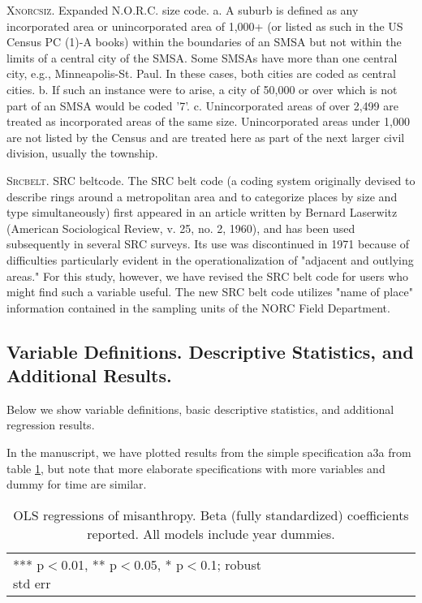 \documentclass[11pt, letterpaper]{article}
\begin{document}
\begin{spacing}{1.4}
\textsc{Xnorcsiz}. Expanded N.O.R.C. size code. 
a. A suburb is defined as any incorporated area or unincorporated area
of 1,000+ (or listed as such in the US Census PC (1)-A books) within
the boundaries of an SMSA but not within the limits of a central city
of the SMSA. Some SMSAs have more than one central city, e.g.,
Minneapolis-St. Paul. In these cases, both cities are coded as central
cities.
b. If such an instance were to arise, a city of 50,000 or over which is
not part of an SMSA would be coded '7'.
c. Unincorporated areas of over 2,499 are treated as incorporated areas
of the same size. Unincorporated areas under 1,000 are not listed by
the Census and are treated here as part of the next larger civil
division, usually the township.

\textsc{Srcbelt}. SRC beltcode. The SRC belt code (a coding system originally devised to describe
rings around a metropolitan area and to categorize places by size
and type simultaneously) first appeared in an article written by
Bernard Laserwitz (American Sociological Review, v. 25, no. 2, 1960),
and has been used subsequently in several SRC surveys.
Its use was discontinued in 1971 because of difficulties particularly
evident in the operationalization of "adjacent and outlying areas."
For this study, however, we have revised the SRC belt code for users
who might find such a variable useful. The new SRC belt code utilizes
"name of place" information contained in the sampling units
of the NORC Field Department.
    
\subsection{Variable Definitions. Descriptive Statistics, and Additional Results.}    
    
Below we show variable definitions, basic descriptive statistics, and additional regression results.

{\footnotesize


}
 
 
 
 

\clearpage
In the manuscript, we have plotted results from the simple specification a3a
from table \ref{regDbyHand}, but note that more elaborate specifications with
more variables and dummy for time are similar.

 \begin{spacing}{.67}
\begin{table}[H]\centering
\caption{OLS regressions  of misanthropy. Beta (fully standardized) coefficients
  reported. All models include year dummies.} \label{regDbyHand}
\begin{tiny} \begin{tabular}{p{1.2in}p{.45in}p{.45in}p{.45in}p{.45in}p{.45in}p{.45in}p{.45in}p{.45in}p{.45in}p{.45 in}}\hline
 \hline  *** p$<$0.01, ** p$<$0.05, * p$<$0.1; robust std err
\end{tabular}\end{tiny}\end{table}
 \end{spacing}


\end{spacing}
\end{document}
